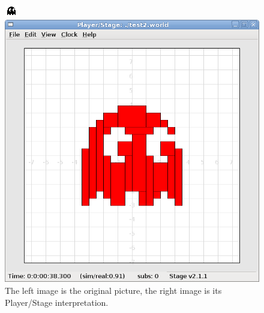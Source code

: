 \documentclass[a4paper]{report}
\newcommand{\plst}{Player/Stage\xspace}
\begin{document}
\begin{figure}
	\centering
	\begin{minipage}[c]{0.3\linewidth}
		\centering
		\includegraphics{./pics/oranges_box/ghost_original.png} %
		
	\end{minipage}%
	\hspace{0.05\linewidth}
	\begin{minipage}[c]{0.6\linewidth}
		\centering
		\includegraphics[width=\linewidth]{./pics/oranges_box/ghost_woutline.png} 
	\end{minipage}	
	\caption{The left image is the original picture, the right image is its \plst interpretation.}
		\label{fig:ghosts}
\end{figure}
\end{document}
